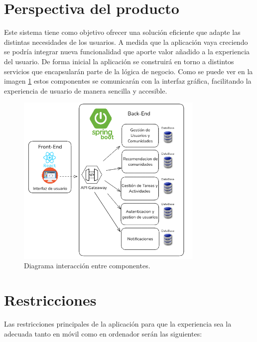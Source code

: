 \section{Perspectiva del producto}
Este sistema tiene como objetivo ofrecer una solución eficiente que adapte las distintas necesidades de los usuarios.
A medida que la aplicación vaya creciendo se podría integrar nueva funcionalidad que aporte valor añadido a la experiencia del usuario.
De forma inicial la aplicación se construirá en torno a distintos servicios que encapsularán parte de la lógica de negocio. Como se puede ver en la imagen \ref{fig:diagrama-componentes} estos componentes se comunicarán con la interfaz gráfica, facilitando la experiencia de usuario de manera sencilla y accesible.
\newpage
\begin{figure}[H]
    \centering
    \includegraphics[width=0.8\textwidth]{fotos/diagrama-componentes.png}
    \caption{Diagrama interacción entre componentes\textbf{}.}
    \label{fig:diagrama-componentes}
\end{figure}
\section{Restricciones}
Las restricciones principales de la aplicación para que la experiencia sea la adecuada tanto en móvil como en ordenador serán las siguientes:

